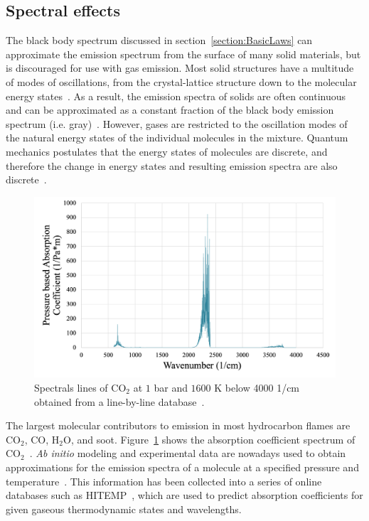 \subsection{Spectral effects}\label{Sec:Nongray}
The black body spectrum discussed in section~\ref{section:BasicLaws} can approximate the emission spectrum from the surface of many solid materials, but is discouraged for use with gas emission. 
Most solid structures have a multitude of modes of oscillations, from the crystal-lattice structure down to the molecular energy states~\cite{Viskanta1975HeatSolids}. As a result, the emission spectra of solids are often continuous and can be approximated as a constant fraction of the black body emission spectrum (i.e. gray)~\cite{Howell2010ThermalTransfer}. 
However, gases are restricted to the oscillation modes of the natural energy states of the individual molecules in the mixture. Quantum mechanics postulates that the energy states of molecules are discrete, and therefore the change in energy states and resulting emission spectra are also discrete~\cite{Hanson2016SpectroscopyGases}.
\begin{figure}
\centering
\includegraphics[width=0.8\linewidth]{figures/ch2/SpectralLinesCO2.png}
\caption{Spectrals lines of CO$_2$ at $1$ bar and $1600$ K below 4000 1/cm obtained from a line-by-line database~\cite{Ren2013AGases}.}
\label{fig:SpectralLines}
\end{figure}


The largest molecular contributors to emission in most hydrocarbon flames are CO$_2$, CO, H$_2$O, and soot. Figure~\ref{fig:SpectralLines} shows the absorption coefficient spectrum of CO$_2$~\cite{Liu2020TheFlames}. 
\textit{Ab initio} modeling and experimental data are nowadays used to obtain approximations for the emission spectra of a molecule at a specified pressure and temperature~\cite{Hanson2016SpectroscopyGases}. This information has been collected into a series of online databases such as HITEMP~\cite{Rothman2010HITEMPDatabase}, which are used to predict absorption coefficients for given gaseous thermodynamic states and wavelengths.

